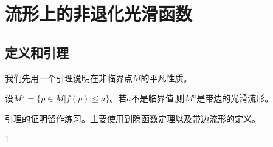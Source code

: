 \ifx\allfiles\undefined

	
	
\else
\fi
\chapter{流形上的非退化光滑函数}
\section{定义和引理}
我们先用一个引理说明在非临界点$M$的平凡性质。
\begin{lemma}[非临界点]
	设$M^a=\{p\in M|f(p)\leq a\}$。若$a$不是临界值,则$M^a$是带边的光滑流形。
\end{lemma}

引理的证明留作练习。主要使用到隐函数定理以及带边流形的定义。

\begin{definition}
	1
\end{definition}
\ifx\allfiles\undefined
	
	
	
	
	\else
	\fi